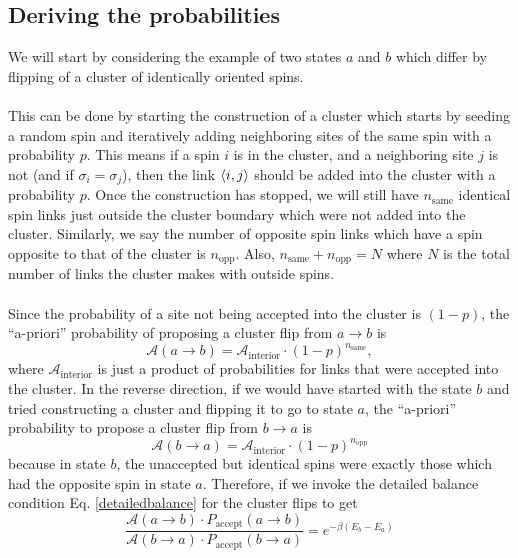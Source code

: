 \documentclass[../journal_main.tex]{subfiles}
\begin{document}
\subsection{Deriving the probabilities}
We will start by considering the example of two states $a$ and $b$ which differ by flipping of a cluster of identically oriented spins.~\\~\\
This can be done by starting the construction of a cluster which starts by seeding a random spin and iteratively adding neighboring sites of the same spin with a probability $p$. This means if a spin $i$ is in the cluster, and a neighboring site $j$ is not (and if $\sigma_i = \sigma_j$), then the link $\expval{i,j}$ should be added into the cluster with a probability $p$. Once the construction has stopped, we will still have $n_\text{same}$ identical spin links just outside the cluster boundary which were not added into the cluster. Similarly, we say the number of opposite spin links which have a spin opposite to that of the cluster is $n_\text{opp}$. Also, $n_\text{same} + n_\text{opp} = N$ where $N$ is the total number of links the cluster makes with outside spins.~\\~\\  
Since the probability of a site not being accepted into the cluster is $(1-p)$, the ``a-priori'' probability of proposing a cluster flip from $a \to b$ is 
\begin{equation}
    \mathcal{A}(a \to b) = \mathcal{A}_\text{interior} \cdot (1-p)^{n_\text{same}},
\end{equation}
where $\mathcal{A}_\text{interior}$ is just a product of probabilities for links that were accepted into the cluster. In the reverse direction, if we would have started with the state $b$ and tried constructing a cluster and flipping it to go to state $a$, the ``a-priori'' probability to propose a cluster flip from $b \to a$ is 
\begin{equation}
    \mathcal{A}(b \to a) = \mathcal{A}_\text{interior} \cdot (1-p)^{n_\text{opp}}
\end{equation}
because in state $b$, the unaccepted but identical spins were exactly those which had the opposite spin in state $a$. Therefore, if we invoke the detailed balance condition Eq. \eqref{detailedbalance} for the cluster flips to get
\begin{equation}
    \frac{\mathcal{A}(a \to b) \cdot P_\text{accept}(a \to b)}{\mathcal{A}(b \to a) \cdot P_\text{accept}(b \to a)} = e^{-\beta(E_b - E_a)}
\end{equation}
\end{document}
